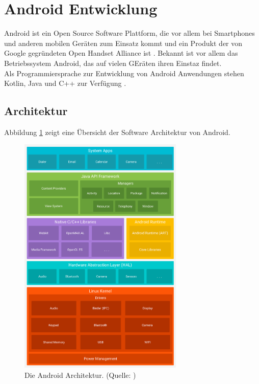 \section{Android Entwicklung}
Android ist ein Open Source Software Plattform, die vor allem bei Smartphones und anderen mobilen Geräten zum Einsatz kommt und ein Produkt der von Google gegründeten Open Handset Alliance ist \citep[S. 4]{gargenta:learning-android}. Bekannt ist vor allem das Betriebssystem Android, das auf vielen GEräten ihren Einstaz findet.\\
Als Programmiersprache zur Entwicklung von Android Anwendungen stehen Kotlin, Java und C++ zur Verfügung \citet{android:fundamentals}.

\subsection{Architektur}
Abbildung \ref{fig:android-stack} zeigt eine Übersicht der Software Architektur von Android. 
\begin{figure}[h!]
\centering
\includegraphics[width=0.7\textwidth]{Abbildungen/android-stack.png}
\caption[Android Architektur]{Die Android Architektur. (Quelle: \citet{android:architecture})}
\label{fig:android-stack}
\end{figure}\\
